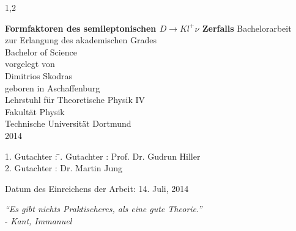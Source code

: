 \documentclass[11pt,a4paper,twoside]{report}
\begin{document}
\begin{spacing}{1,2}

%
%


\newcommand{\thetitle}{Formfaktoren des semileptonischen $D \rightarrow  K l^+ \nu$ Zerfalls}

\thispagestyle{empty}
\begin{center}
\Huge\textbf{\thetitle}
\vfill
\vfill
\Large
Bachelorarbeit \\ zur Erlangung des akademischen Grades \\ Bachelor of Science \\
\vspace{20pt}
\normalsize
vorgelegt von \\[5pt]
{\Large Dimitrios Skodras} \\[5pt]
geboren in Aschaffenburg \\
\vspace{20pt}
Lehrstuhl für Theoretische Physik IV \\ Fakultät Physik \\
Technische Universität Dortmund \\ 2014
\end{center}
\newpage


\thispagestyle{empty}
\vspace*{\fill}
\begin{tabbing}
1. Gutachter : \=. Gutachter : \>Prof. Dr. Gudrun Hiller \\[11pt]
2. Gutachter : \>Dr. Martin Jung\\[11pt]
\end{tabbing}
\vspace{11pt}
Datum des Einreichens der Arbeit: 14. Juli, 2014
\newpage
\thispagestyle{empty}
\begin{flushright} 
\textit{``Es gibt nichts Praktischeres, als eine gute Theorie.''}\\
- \textit{Kant, Immanuel}\\
\vspace{2cm}
\end{flushright}


\end{spacing}
\end{document}

